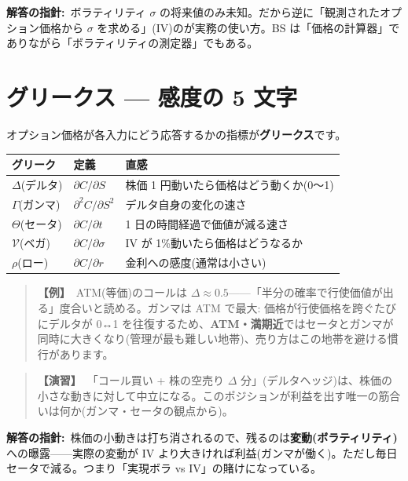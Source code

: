\documentclass{article}
\begin{document}
\textbf{解答の指針:}\ ボラティリティ \( \sigma \) の将来値のみ未知。だから逆に「観測されたオプション価格から \( \sigma \) を求める」(IV)のが実務の使い方。BS は「価格の計算器」でありながら「ボラティリティの測定器」でもある。

\section{グリークス — 感度の 5 文字}

オプション価格が各入力にどう応答するかの指標が\textbf{グリークス}です。

\begin{center}
\begin{tabular}{|l|l|l|}
\hline
グリーク & 定義 & 直感 \\
\hline
\( \Delta \)(デルタ) & \( \partial C / \partial S \) & 株価 1 円動いたら価格はどう動くか(0〜1) \\
\( \Gamma \)(ガンマ) & \( \partial^2 C / \partial S^2 \) & デルタ自身の変化の速さ \\
\( \Theta \)(セータ) & \( \partial C / \partial t \) & 1 日の時間経過で価値が減る速さ \\
\( \mathcal{V} \)(ベガ) & \( \partial C / \partial \sigma \) & IV が 1\%動いたら価格はどうなるか \\
\( \rho \)(ロー) & \( \partial C / \partial r \) & 金利への感度(通常は小さい) \\
\hline
\end{tabular}
\end{center}

\begin{quote}
\textbf{【例】}\ ATM(等価)のコールは \( \Delta \approx 0.5 \)——「半分の確率で行使価値が出る」度合いと読める。ガンマは ATM で最大: 価格が行使価格を跨ぐたびにデルタが 0↔1 を往復するため、\textbf{ATM・満期近}ではセータとガンマが同時に大きくなり(管理が最も難しい地帯)、売り方はこの地帯を避ける慣行があります。
\end{quote}

\begin{quote}
\textbf{【演習】}\ 「コール買い + 株の空売り \( \Delta \) 分」(デルタヘッジ)は、株価の小さな動きに対して中立になる。このポジションが利益を出す唯一の筋合いは何か(ガンマ・セータの観点から)。
\end{quote}

\textbf{解答の指針:}\ 株価の小動きは打ち消されるので、残るのは\textbf{変動(ボラティリティ)}への曝露——実際の変動が IV より大きければ利益(ガンマが働く)。ただし毎日セータで減る。つまり「実現ボラ vs IV」の賭けになっている。
\end{document}
